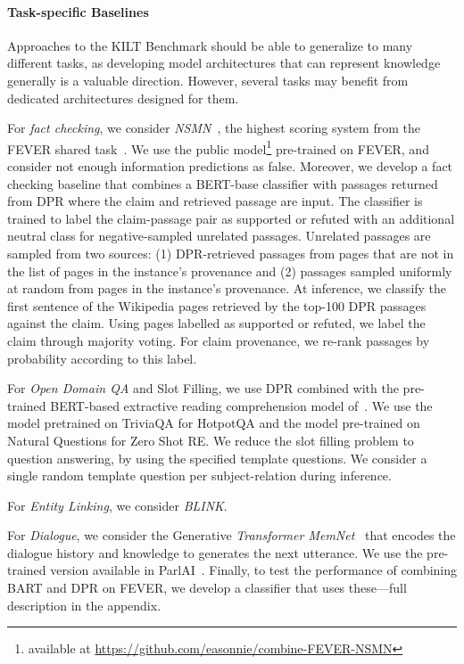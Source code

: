 \documentclass[11pt]{article}
\begin{document}
\paragraph{Task-specific Baselines}
\label{sec:baselie-task}

Approaches to the KILT Benchmark should be able to generalize to many different tasks, as developing model architectures that can represent knowledge generally is a valuable direction. However, several tasks may benefit from dedicated architectures designed for them. 


For \emph{fact checking}, we consider \emph{NSMN}~\cite{nie2019combining}, the highest scoring system from the FEVER shared task~\cite{thorne2018fact}. We use the public model\footnote{available at \url{https://github.com/easonnie/combine-FEVER-NSMN}} pre-trained on FEVER, and consider not enough information predictions as false.
Moreover, we develop a fact checking baseline that combines a BERT-base classifier with passages returned from DPR where the claim and retrieved passage are input.
The classifier is trained to label the claim-passage pair as supported or refuted with an additional neutral class for negative-sampled unrelated passages. 
Unrelated passages are sampled from two sources: (1) DPR-retrieved passages from pages that are not in the list of pages in the instance's provenance and (2) passages sampled uniformly at random from pages in the instance's provenance. 
At inference, we classify the first sentence of the Wikipedia pages retrieved by the top-100 DPR passages against the claim. 
Using pages labelled as supported or refuted, we label the claim through majority voting.
For claim provenance, we re-rank passages by probability according to this label. 


For \emph{Open Domain QA} and {Slot Filling}, we use DPR combined with the pre-trained BERT-based extractive reading comprehension model of~\citet{karpukhin2020dense}. We use the model pretrained on TriviaQA for HotpotQA and the model pre-trained on Natural Questions for Zero Shot RE.
We reduce the slot filling problem to question answering, by using the specified template questions. We consider a single random template question per subject-relation during inference.


For \emph{Entity Linking}, we consider \emph{BLINK}.


For \emph{Dialogue}, we consider the Generative \emph{Transformer MemNet}~\cite{dinan2018wizard} that encodes the dialogue history and knowledge to generates the next utterance. We use the pre-trained version available in ParlAI~\cite{miller2017parlai}.
Finally, to test the performance of combining BART and DPR on FEVER, we develop a classifier that uses these---full description in the appendix.
\end{document}
